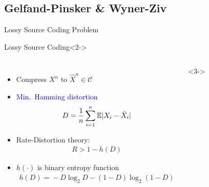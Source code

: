 \documentclass[10pt]{beamer}
\begin{document}
\subsection{Gelfand-Pinsker \& Wyner-Ziv}
\begin{frame}{Lossy Source Coding Problem}
  \begin{block}{Lossy Source Coding}<2->
    \begin{columns}
      \begin{itemize}
      \item<2-> Compress $X^n$ to $\hat{X}^n \in \mathcal{C}$
      \item<2-> \textcolor{blue}{Min.~Hamming distortion}
        \begin{align*}
          D=\frac{1}{n} \sum_{i=1}^n \mathbb{E} \lvert{X_i-\hat{X}_i}\rvert
        \end{align*}
      \item<3-> Rate-Distortion theory: \vspace{-0.15cm}
        \begin{align*}
          R > 1 - h(D)
        \end{align*}
        \vspace{-1.0cm}
      \item<3-> $h(\cdot)$ is binary entropy function
        \small{
          \begin{align*}
            h(D)\!=\!-D \log_2 D \!-\! (1\!-\!D) \log_2 (1-D)
          \end{align*}
        }
      \end{itemize}
      <3->
      \setlength\tikzheight{3cm} 
      \setlength\tikzwidth{3.5cm} 
      \centering{}
    \end{columns}
  \end{block}

\end{frame}
\end{document}
